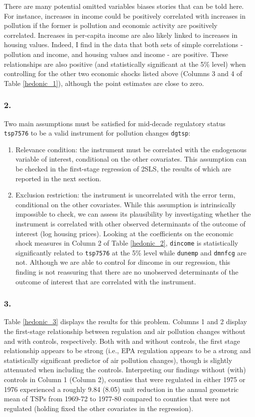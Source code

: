 \documentclass[12pt]{article}
\begin{document}
There are many potential omitted variables biases stories that can be told here. For instance, increases in  income could be positively correlated with increases in pollution if the former is pollution and economic activity are positively correlated. Increases in per-capita income are also likely linked to increases in housing values. Indeed, I find in the data that both sets of simple correlations - pollution and income, and housing values and income - are positive. These relationships are also positive (and statistically significant at the 5\% level) when controlling for the other two economic shocks listed above (Columns 3 and 4 of Table \ref{hedonic_1}), although the point estimates are close to zero.

\subsubsection*{2.}
Two main assumptions must be satisfied for mid-decade regulatory status \texttt{tsp7576} to be a valid instrument for pollution changes \texttt{dgtsp}:
\begin{enumerate}
\item Relevance condition: the instrument must be correlated with the endogenous variable of interest, conditional on the other covariates. This assumption can be checked in the first-stage regression of 2SLS, the results of which are reported in the next section.
\item Exclusion restriction: the instrument is uncorrelated with the error term, conditional on the other covariates. While this assumption is intrinsically impossible to check, we can assess its plausibility by investigating whether the instrument is correlated with other observed determinants of the outcome of interest (log housing prices). Looking at the coefficients on the economic shock measures in Column 2 of Table \ref{hedonic_2}, \texttt{dincome} is statistically significantly related to \texttt{tsp7576} at the 5\% level while \texttt{dunemp} and \texttt{dmnfcg} are not. Although we are able to control for dincome in our regression, this finding is not reassuring that there are no unobserved determinants of the outcome of interest that are correlated with the instrument.
\end{enumerate}

\subsubsection*{3.}
Table \ref{hedonic_3} displays the results for this problem. Columns 1 and 2 display the first-stage relationship between regulation and air pollution changes without and with controls, respectively. Both with and without controls, the first stage relationship appears to be strong (i.e., EPA regulation appears to be a strong and statistically significant predictor of air pollution changes), though is slightly attenuated when including the controls. Interpreting our findings without (with) controls in Column 1 (Column 2), counties that were regulated in either 1975 or 1976 experienced a roughly 9.84 (8.05) unit reduction in the annual geometric mean of TSPs from 1969-72 to 1977-80 compared to counties that were not regulated (holding fixed the other covariates in the regression).
\end{document}
